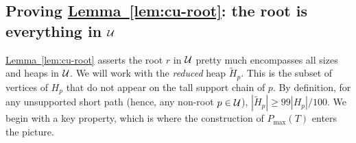 \documentclass[11pt]{article}
\theoremstyle{definition}
\newcommand{\cL}{{\cal L}}
\newcommand{\cU}{{\cal U}}
\newcommand{\Lem}[1]{\hyperref[lem:#1]{Lemma~\ref*{lem:#1}}} %
\newcommand{\pmax}{P_{\max}}
\newcommand{\redH}{\widetilde{H}}
\begin{document}
\subsection{Proving \Lem{cu-root}: the root is everything in $\cU$} \label{sec:weight}

\Lem{cu-root} asserts the root $r$ in $\cU$ pretty much encompasses all sizes and heaps in $\cU$.
We will work with the \emph{reduced} heap $\redH_p$. This is the subset of vertices of $H_p$ that 
do not appear on the tall support chain of $p$.
By definition, for any unsupported short path
(hence, any non-root $p \in \cU$), $|\redH_p| \geq 99|H_p|/100$. 
We begin with a key property, which is where the construction of $\pmax(T)$ enters the picture.

%
%
%
\end{document}
